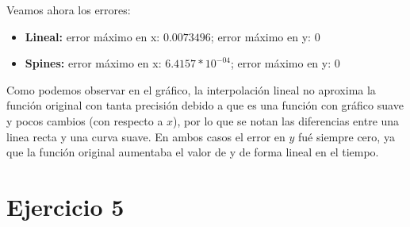 \documentclass[a4paper,10pt]{article}
\begin{document}
\par Veamos ahora los errores:

\begin{itemize}
	\item \textbf{Lineal:} error máximo en x: $0.0073496$; error máximo en y: $0$
	\item \textbf{Spines:} error máximo en x: $6.4157 * 10^{-04}$; error máximo en y: $0$
\end{itemize}

\par Como podemos observar en el gráfico, la interpolación lineal no aproxima la función original con tanta precisión debido a que es una función con gráfico suave y pocos cambios (con respecto a $x$), por lo que se notan las diferencias entre una linea recta y una curva suave. En ambos casos el error en $y$ fué siempre cero, ya que la función original aumentaba el valor de y de forma lineal en el tiempo.

\section{Ejercicio 5}
\end{document}
